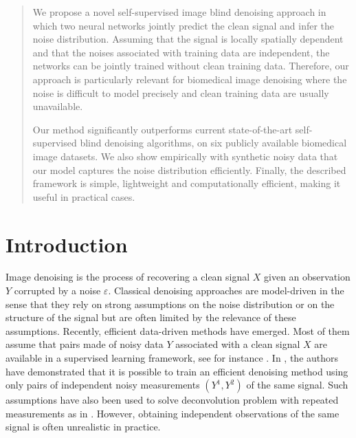 \documentclass{article}
\begin{document}
\printAffiliationsAndNotice{}  %


\begin{abstract}
We propose a novel self-supervised  image blind denoising approach  in which two neural networks jointly predict the clean signal and infer the noise distribution.
Assuming that the signal is locally spatially dependent and that the noises associated with training data are independent, the networks can be jointly trained without clean training data. Therefore, our approach is  particularly relevant for biomedical image denoising where the noise is difficult to model precisely and clean training data are usually unavailable.

Our method significantly outperforms current state-of-the-art self-supervised blind denoising algorithms, on six publicly available biomedical image datasets. We also show empirically with synthetic noisy data that our model captures the noise distribution efficiently. Finally, the described framework is simple, lightweight and computationally efficient, making it useful in practical cases.
\end{abstract}

\section{Introduction}
\label{sec:introduction}

Image denoising is the process of recovering a clean signal $X$ given an observation $Y$ corrupted by a noise $\varepsilon$. Classical denoising approaches  are model-driven in the sense that they rely on strong assumptions on the noise distribution or on the structure of the signal but are often  limited by the relevance of these assumptions.
Recently, efficient data-driven methods have emerged. Most of them assume that pairs made of noisy data $Y$ associated with a clean signal $X$ are available in a supervised learning framework, see for instance \cite{weigert2017content}. In \cite{lehtinen2018noise2noise}, the authors have demonstrated that it is possible to train an efficient denoising method using only pairs of independent noisy measurements $(Y^1, Y^2)$ of the same signal. Such assumptions have also been used to solve deconvolution problem with repeated measurements as in \cite{delaigle2008deconvolution}. However, obtaining  independent observations of the same signal is often unrealistic in practice.
\end{document}
